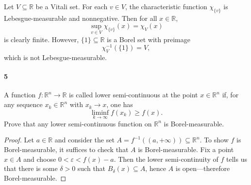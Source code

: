 \documentclass[12pt]{article}
\newlength{\myparskip}
\newenvironment{fullbox}{\begin{lrbox}{\savefullbox}\begin{minipage}{\dimexpr\textwidth-2\fboxsep\relax}\setlength{\parskip}{\myparskip}}{\end{minipage}\end{lrbox}\framebox[\textwidth]{\usebox{\savefullbox}}}
\newenvironment{pbox}[1][]{\begin{fullbox}\ifx#1\empty\else\paragraph{#1}\fi}{\end{fullbox}}
\newcommand{\R}{\mathbb{R}}
\newcommand{\eps}{\varepsilon}
\newcommand{\<}{\langle}
\renewcommand{\>}{\rangle}
\begin{document}
Let $V \subseteq \R$ be a Vitali set.
For each $v \in V$, the characteristic function $\chi_{\{v\}}$ is Lebesgue-measurable and nonnegative.
Then for all $x \in \R$,
\[
    \sup_{v \in V} \chi_{\{v\}}(x) = \chi_V(x)
\]
is clearly finite. However, $\{1\} \subseteq \R$ is a Borel set with preimage
\[
    \chi_V^{-1}(\{1\}) = V,
\]
which is not Lebesgue-measurable.


\newpage
\begin{pbox}[5]
    A function $f : \R^n \to \R$ is called lower semi-continuous at the point $x \in \R^n$ if, for any sequence $x_k \in \R^n$ with $x_k \to x$, one has
    \[
        \liminf_{k \to \infty} f(x_k) \geq f(x).
    \]
    Prove that any lower semi-continuous function on $\R^n$ is Borel-measurable.
\end{pbox}

\begin{proof}
    Let $a \in \R$ and consider the set $A = f^{-1}((a, +\infty)) \subseteq \R^n$.
    To show $f$ is Borel-measurable, it suffices to check that $A$ is Borel-measurable.
    Fix a point $x \in A$ and choose $0 < \eps < f(x) - a$.
    Then the lower semi-continuity of $f$ tells us that there is some $\delta > 0$ such that $B_{\delta}(x) \subseteq A$, hence $A$ is open---therefore Borel-measurable. 
\end{proof}
\end{document}
